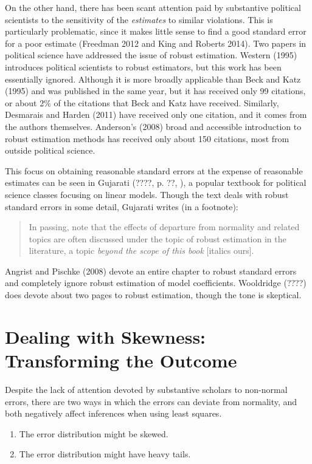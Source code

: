 \documentclass[12pt]{article}
\begin{document}
On the other hand, there has been scant attention paid by substantive political scientists to the sensitivity of the \textit{estimates} to similar violations. 
This is particularly problematic, since it makes little sense to find a good standard error for a poor estimate (Freedman 2012 and King and Roberts 2014). 
Two papers in political science have addressed the issue of robust estimation. 
Western (1995) introduces political scientists to robust estimators, but this work has been essentially ignored. 
Although it is more broadly applicable than Beck and Katz (1995) and was published in the same year, but it has received only 99 citations, or  about 2\% of the citations that Beck and Katz have received. 
Similarly, Desmarais and Harden (2011) have received only one citation, and it comes from the authors themselves.
Anderson's (2008) broad and accessible introduction to robust estimation methods has received only about 150 citations, most from outside political science.

This focus on obtaining reasonable standard errors at the expense of reasonable estimates can be seen in Gujarati (????, p. ??, ), a popular textbook for political science classes focusing on linear models. 
Though the text deals with robust standard errors in some detail, Gujarati writes (in a footnote):
\begin{quote}
In passing, note that the effects of departure from normality and related topics are often discussed under the topic of robust estimation in the literature, a topic \textit{beyond the scope of this book} [italics ours].
\end{quote}
Angrist and Pischke (2008) devote an entire chapter to robust standard errors and completely ignore robust estimation of model coefficients. 
Wooldridge (????) does devote about two pages to robust estimation, though the tone is skeptical.

\section*{Dealing with Skewness: Transforming the Outcome}

Despite the lack of attention devoted by substantive scholars to non-normal errors, there are two ways in which the errors can deviate from normality, and both negatively affect inferences when using least squares. 
\begin{enumerate}
\item The error distribution might be skewed. 
\item The error distribution might have heavy tails. 
\end{enumerate}
\end{document}
